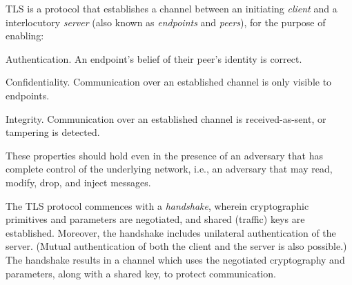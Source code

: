 \ifPresentationNotes
{}
\fi

TLS is a protocol that establishes a channel between an initiating \emph{client} and a 
interlocutory \emph{server} (also known as \emph{endpoints} and \emph{peers}),
for the purpose of enabling:


\begin{description}

\item Authentication. 
  An endpoint's belief of their peer's identity is correct.

\item Confidentiality. Communication over an established channel is only
  visible to endpoints.

\item Integrity. Communication over an established channel is received-as-sent, 
  or tampering is detected.

\end{description}

\noindent
These properties should hold even in the presence of an adversary that has 
complete control of the underlying network, i.e., an adversary that may read, 
modify, drop, and inject messages. 

\ifPresentationNotes
{}
\fi

The TLS protocol commences with a \emph{handshake}, wherein cryptographic primitives 
and parameters are negotiated, and shared (traffic) keys are established. 
Moreover, the handshake %
includes unilateral authentication of the server. (Mutual authentication of both 
the client and the server is also possible.) %
The handshake results in a channel which uses the negotiated cryptography and 
parameters, along with a shared key, to protect communication.


